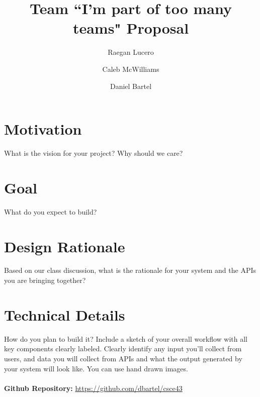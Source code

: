 \documentclass{article}
\title{Team ``I'm part of too many teams" Proposal}
\date{}
\author{
	Raegan Lucero
	\and
	 Caleb McWilliams
	\and
	 Daniel Bartel
 }
\begin{document}
\maketitle

\section*{Motivation}
What is the vision for your project? Why should we care?

\section*{Goal}
What do you expect to build?

\section*{Design Rationale}
Based on our class discussion, what is the rationale for your system and the APIs you are bringing together?
	
\section*{Technical Details}
How do you plan to build it? Include a sketch of your overall workflow with all key components clearly labeled. Clearly identify any input you'll collect from users, and data you will collect from APIs and what the output generated by your system will look like. You can use hand drawn images.
\\ \ \\
	\textbf{Github Repository:} \url{https://github.com/dbartel/csce43}
\end{document}
